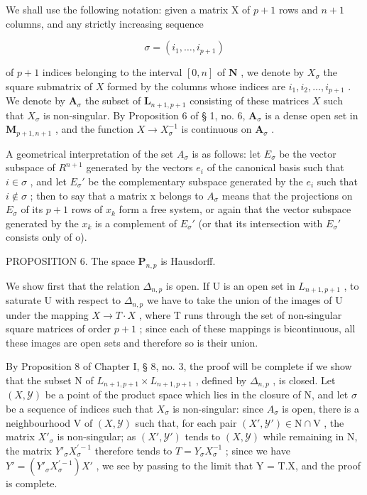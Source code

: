 We shall use the following notation: given a matrix X of \(p + 1\) rows and \(n + 1\) columns, and any strictly increasing sequence

\[
\sigma = (i _ {1}, \dots , i _ {p + 1})
\]

of \(p + 1\) indices belonging to the interval \([0, n]\) of \(\mathbf{N}\) , we denote by \(X_{\sigma}\) the square submatrix of \(X\) formed by the columns whose indices are \(i_1, i_2, \ldots, i_{p+1}\) . We denote by \(\mathbf{A}_{\sigma}\) the subset of \(\mathbf{L}_{n+1, p+1}\) consisting of these matrices \(X\) such that \(X_{\sigma}\) is non-singular. By Proposition 6 of § 1, no. 6, \(\mathbf{A}_{\sigma}\) is a dense open set in \(\mathbf{M}_{p+1, n+1}\) , and the function \(X \to X_{\sigma}^{-1}\) is continuous on \(\mathbf{A}_{\sigma}\) .

A geometrical interpretation of the set \(A_{\sigma}\) is as follows: let \(E_{\sigma}\) be the vector subspace of \(R^{n+1}\) generated by the vectors \(e_{i}\) of the canonical basis such that \(i \in \sigma\) , and let \(E_{\sigma}'\) be the complementary subspace generated by the \(e_{i}\) such that \(i \notin \sigma\) ; then to say that a matrix x belongs to \(A_{\sigma}\) means that the projections on \(E_{\sigma}\) of its \(p + 1\) rows of \(x_{k}\) form a free system, or again that the vector subspace generated by the \(x_{k}\) is a complement of \(E_{\sigma}'\) (or that its intersection with \(E_{\sigma}'\) consists only of o).

PROPOSITION 6. The space \(\mathbf{P}_{n,p}\) is Hausdorff.

We show first that the relation \(\Delta_{n,p}\) is open. If U is an open set in \(L_{n+1,p+1}\) , to saturate U with respect to \(\Delta_{n,p}\) we have to take the union of the images of U under the mapping \(X \to T \cdot X\) , where T runs through the set of non-singular square matrices of order \(p + 1\) ; since each of these mappings is bicontinuous, all these images are open sets and therefore so is their union.

By Proposition 8 of Chapter I, § 8, no. 3, the proof will be complete if we show that the subset N of \(L_{n+1,p+1} \times L_{n+1,p+1}\) , defined by \(\Delta_{n,p}\) , is closed. Let \((X,\mathcal{Y})\) be a point of the product space which lies in the closure of N, and let \(\sigma\) be a sequence of indices such that \(X_{\sigma}\) is non-singular: since \(A_{\sigma}\) is open, there is a neighbourhood V of \((X,\mathcal{Y})\) such that, for each pair \((X',\mathcal{Y}') \in \mathrm{N} \cap \mathrm{V}\) , the matrix \(X'_{\sigma}\) is non-singular; as \((X',\mathcal{Y}')\) tends to \((X,\mathcal{Y})\) while remaining in N, the matrix \(Y'_{\sigma}X_{\sigma}^{\prime -1}\) therefore tends to \(T = Y_{\sigma}X_{\sigma}^{-1}\) ; since we have \(Y' = (Y'_{\sigma}X_{\sigma}^{\prime -1})X'\) , we see by passing to the limit that Y = T.X, and the proof is complete.

